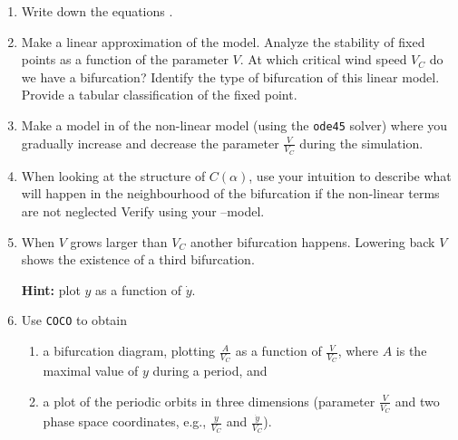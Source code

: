 \begin{enumerate}

\item Write down the equations . 

\item Make a linear approximation of the model. Analyze the stability of  fixed
points as a function of the parameter $V$. At which critical wind speed $V_C$ do we have a bifurcation?
Identify the type of bifurcation of this linear model. Provide a tabular classification of the fixed point. 

\item Make a model in  of the non-linear model (using the \verb!ode45! solver) where you gradually increase and decrease the parameter $\frac{V}{V_C}$ during the simulation.

\item When looking at the structure of $C(\alpha)$,
use your intuition to describe what will happen in the
neighbourhood of the bifurcation if the non-linear terms are not
neglected Verify using your --model.

\item When $V$ grows larger than $V_C$ another bifurcation happens.
Lowering back $V$ shows the existence of a third bifurcation.

\textbf{Hint:} plot $y$ as a function of $\dot{y}$.

\item Use \verb!COCO! to obtain
\begin{enumerate}
	\item  a bifurcation diagram, plotting $\frac{A}{V_C}$ as a function of $\frac{V}{V_C}$, where $A$ is the maximal value of $y$ during a period, and
	\item  a plot of the periodic orbits in three dimensions (parameter $\frac{V}{V_C}$ and two phase space coordinates, e.g., $\frac{y}{V_C}$ and $\frac{\dot{y}}{V_C}$).
\end{enumerate}
 

\end{enumerate}

\noindent{}

